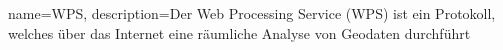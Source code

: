 {
    name=WPS,
    description={Der Web Processing Service (WPS) ist ein Protokoll, welches über das Internet eine räumliche Analyse von Geodaten durchführt}
}












